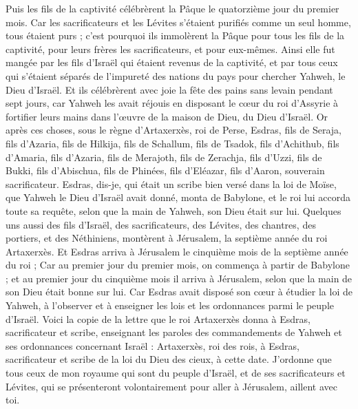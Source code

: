 \begin{multicols}{2}
Puis les fils de la captivité célébrèrent la Pâque le quatorzième jour du premier mois.
Car les sacrificateurs et les Lévites s'étaient purifiés comme un seul homme, tous étaient purs ; c'est pourquoi ils immolèrent la Pâque pour tous les fils de la captivité, pour leurs frères les sacrificateurs, et pour eux-mêmes.
Ainsi elle fut mangée par les fils d’Israël qui étaient revenus de la captivité, et par tous ceux qui s'étaient séparés de l’impureté des nations du pays pour chercher Yahweh, le Dieu d'Israël.
Et ils célébrèrent avec joie la fête des pains sans levain pendant sept jours, car Yahweh les avait réjouis en disposant  le cœur du roi d'Assyrie à fortifier leurs mains dans l’œuvre de la maison de Dieu, du Dieu d'Israël.
\VerseOne{}Or après ces choses, sous le règne d'Artaxerxès, roi de Perse, Esdras, fils de Seraja, fils d'Azaria, fils de Hilkija,
fils de Schallum, fils de Tsadok, fils d'Achithub,
fils d'Amaria, fils d'Azaria, fils de Merajoth,
fils de Zerachja, fils d'Uzzi, fils de Bukki,
fils d'Abischua, fils de Phinées, fils d'Eléazar, fils d'Aaron, souverain sacrificateur.
Esdras, dis-je, qui était un scribe bien versé dans la loi de Moïse, que Yahweh le Dieu d'Israël avait donné, monta de Babylone, et le roi lui accorda toute sa requête, selon que la main de Yahweh, son Dieu était sur lui.
Quelques uns aussi des fils d'Israël, des sacrificateurs, des Lévites, des chantres, des portiers, et des Néthiniens, montèrent à Jérusalem, la septième année du roi Artaxerxès.
Et Esdras arriva à Jérusalem le cinquième mois de la septième année du roi ;
Car au premier jour du premier mois, on commença à partir de Babylone ; et au premier jour du cinquième mois il arriva à Jérusalem, selon que la main de son Dieu était bonne sur lui.
Car Esdras avait disposé son cœur à étudier la loi de Yahweh, à l’observer et à enseigner les lois et les ordonnances parmi le peuple d'Israël.
Voici la copie de la lettre que le roi Artaxerxès donna à Esdras, sacrificateur et scribe, enseignant les paroles des commandements de Yahweh et ses ordonnances concernant Israël :
Artaxerxès, roi des rois, à Esdras, sacrificateur et scribe de la loi du Dieu des cieux, à cette date.
J’ordonne que tous ceux de mon royaume qui sont du peuple d'Israël, et de ses sacrificateurs et Lévites, qui se présenteront volontairement pour aller à Jérusalem, aillent avec toi.

\end{multicols}
